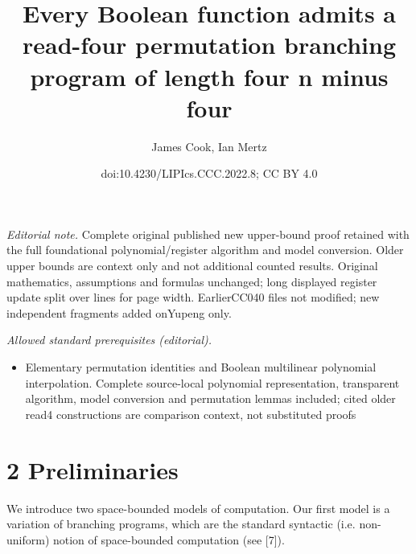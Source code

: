 \documentclass[10pt,a4paper]{article}
\title{Every Boolean function admits a read-four permutation branching program of length four n minus four}
\author{James Cook, Ian Mertz}
\date{doi:10.4230/LIPIcs.CCC.2022.8; CC BY 4.0}
\begin{document}
\maketitle
\noindent\textit{Editorial note.} Complete original published new upper-bound proof retained with the full foundational polynomial/register algorithm and model conversion. Older upper bounds are context only and not additional counted results. Original mathematics, assumptions and formulas unchanged; long displayed register update split over lines for page width. EarlierCC040 files not modified; new independent fragments added onYupeng only.\par\medskip
\noindent\textit{Allowed standard prerequisites (editorial).}\begin{itemize}
\item Elementary permutation identities and Boolean multilinear polynomial interpolation. Complete source-local polynomial representation, transparent algorithm, model conversion and permutation lemmas included; cited older read4 constructions are comparison context, not substituted proofs
\end{itemize}\medskip
\section*{2 Preliminaries}
We introduce two space-bounded models of computation. Our first model is a variation of branching programs, which are the standard syntactic (i.e. non-uniform) notion of space-bounded computation (see [7]).
\end{document}
